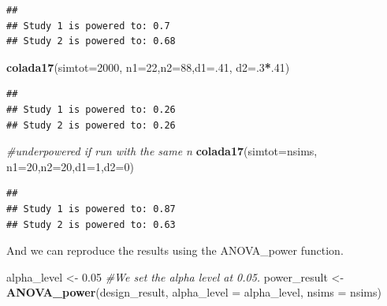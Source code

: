 \documentclass[]{book}
\newenvironment{Shaded}{\begin{snugshade}}{\end{snugshade}}
\newcommand{\CommentTok}[1]{\textcolor[rgb]{0.56,0.35,0.01}{\textit{#1}}}
\newcommand{\DataTypeTok}[1]{\textcolor[rgb]{0.13,0.29,0.53}{#1}}
\newcommand{\DecValTok}[1]{\textcolor[rgb]{0.00,0.00,0.81}{#1}}
\newcommand{\FloatTok}[1]{\textcolor[rgb]{0.00,0.00,0.81}{#1}}
\newcommand{\KeywordTok}[1]{\textcolor[rgb]{0.13,0.29,0.53}{\textbf{#1}}}
\newcommand{\NormalTok}[1]{#1}
\newcommand{\OperatorTok}[1]{\textcolor[rgb]{0.81,0.36,0.00}{\textbf{#1}}}
\newcommand{\StringTok}[1]{\textcolor[rgb]{0.31,0.60,0.02}{#1}}
\begin{document}
\begin{verbatim}
## 
## Study 1 is powered to: 0.7
## Study 2 is powered to: 0.68
\end{verbatim}

\begin{Shaded}
\begin{Highlighting}[]
  \KeywordTok{colada17}\NormalTok{(}\DataTypeTok{simtot=}\DecValTok{2000}\NormalTok{, }\DataTypeTok{n1=}\DecValTok{22}\NormalTok{,}\DataTypeTok{n2=}\DecValTok{88}\NormalTok{,}\DataTypeTok{d1=}\NormalTok{.}\DecValTok{41}\NormalTok{, }\DataTypeTok{d2=}\NormalTok{.}\DecValTok{3}\OperatorTok{*}\NormalTok{.}\DecValTok{41}\NormalTok{)}
\end{Highlighting}
\end{Shaded}

\begin{verbatim}
## 
## Study 1 is powered to: 0.26
## Study 2 is powered to: 0.26
\end{verbatim}

\begin{Shaded}
\begin{Highlighting}[]
\CommentTok{#underpowered if run with the same n}
\KeywordTok{colada17}\NormalTok{(}\DataTypeTok{simtot=}\NormalTok{nsims, }\DataTypeTok{n1=}\DecValTok{20}\NormalTok{,}\DataTypeTok{n2=}\DecValTok{20}\NormalTok{,}\DataTypeTok{d1=}\DecValTok{1}\NormalTok{,}\DataTypeTok{d2=}\DecValTok{0}\NormalTok{)  }
\end{Highlighting}
\end{Shaded}

\begin{verbatim}
## 
## Study 1 is powered to: 0.87
## Study 2 is powered to: 0.63
\end{verbatim}

And we can reproduce the results using the ANOVA\_power function.

\begin{Shaded}
\begin{Highlighting}[]
\NormalTok{alpha_level <-}\StringTok{ }\FloatTok{0.05} \CommentTok{#We set the alpha level at 0.05. }
\NormalTok{power_result <-}\StringTok{ }\KeywordTok{ANOVA_power}\NormalTok{(design_result, }\DataTypeTok{alpha_level =}\NormalTok{ alpha_level, }\DataTypeTok{nsims =}\NormalTok{ nsims)}
\end{Highlighting}
\end{Shaded}
\end{document}

